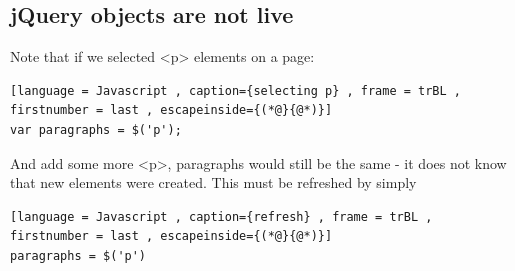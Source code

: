 \documentclass[a4paper]{article}
\theoremstyle{plain}
\theoremstyle{definition}
\theoremstyle{remark}
\begin{document}
\begin{flushleft}
\subsection{jQuery objects are not live}
Note that if we selected <p> elements on a page:
\begin{lstlisting}[language = Javascript , caption={selecting p} , frame = trBL , firstnumber = last , escapeinside={(*@}{@*)}]
var paragraphs = $('p');
\end{lstlisting}
And add some more <p>, paragraphs would still be the same - it does not know that new elements were created. This must be refreshed by simply
\begin{lstlisting}[language = Javascript , caption={refresh} , frame = trBL , firstnumber = last , escapeinside={(*@}{@*)}]
paragraphs = $('p')
\end{lstlisting}

\end{flushleft}
\end{document}
